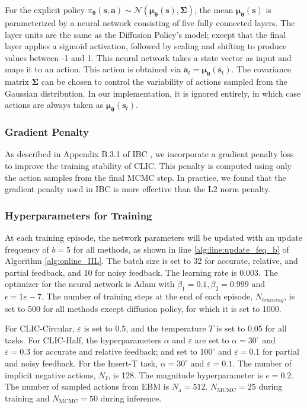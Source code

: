For the explicit policy $\pi_{\bm \theta}(\bm s,\bm a) \sim \mathcal{N} (\bm \mu_{\bm \theta}(\bm s), \bm \Sigma)$, the mean $\bm \mu_{\bm \theta}(\bm s)$ is parameterized by a neural network consisting of five fully connected layers. The layer units are the same as the Diffusion Policy's model; except that the final layer applies a sigmoid activation, followed by scaling and shifting to produce values between -1 and 1. This neural network takes a state vector as input and maps it to an action.
This action is obtained via $\bm a_t = \bm \mu_{\bm \theta}(\bm s_t)$.
The covariance matrix $\bm \Sigma$ can be chosen to control the variability of actions sampled from the Gaussian distribution. In our implementation, it is ignored entirely, in which case actions are always taken as $\bm \mu_{\bm \theta}(\bm s_t)$.



\subsubsection{Gradient Penalty}
As described in Appendix B.3.1 of IBC \cite{2022_implicit_BC}, we incorporate a gradient penalty loss to improve the training stability of CLIC. This penalty is computed using only the action samples from the final MCMC step. In practice, we found that the gradient penalty used in IBC is more effective than the L2 norm penalty.

\subsubsection{Hyperparameters for Training}
At each training episode, the network parameters will be updated with an update frequency of $b=5$ for all methods, as shown in line \ref{alg:line:update_feq_b} of Algorithm \ref{alg:online_IIL}.
The batch size is set to 32 for accurate, relative, and partial feedback, and 10 for noisy feedback. 
The learning rate is 0.003. 
The optimizer for the neural network is Adam with $\beta_1 = 0.1, \beta_2 = 0.999$ and $\epsilon=1e-7$.
The number of training steps at the end of each episode, $N_{training}$, is set to 500 for all methods except diffusion policy, for which it is set to 1000.

For CLIC-Circular, $\varepsilon$ is set to $0.5$, and the temperature $T$ is set to 0.05 for all tasks.
For CLIC-Half, the hyperparameters $\alpha$ and $\varepsilon$ are set to $\alpha=30^\circ$ and $\varepsilon = 0.3$ for accurate and relative feedback; and set to $100^\circ$ and $\varepsilon = 0.1$  for partial and noisy feedback. 
For the Insert-T task, $\alpha=30^\circ$ and $\varepsilon = 0.1$.
The number of implicit negative actions, $N_I$, is 128. 
The magnitude hyperparameter is $e = 0.2$.
The number of sampled actions from EBM is $N_{\text{a}} = 512$.
$N_{\text{MCMC}} = 25$ during training and $N_{\text{MCMC}} = 50$ during inference.  

